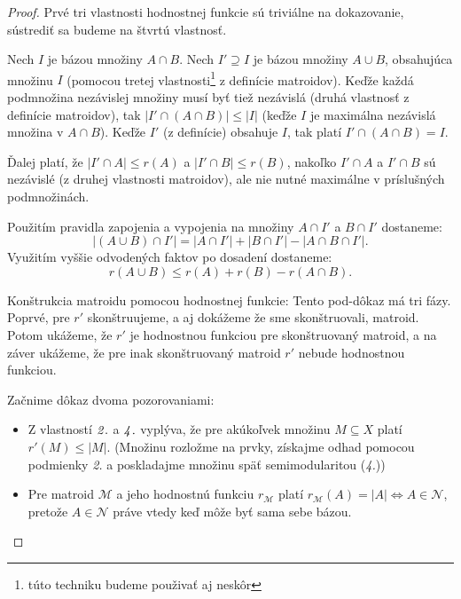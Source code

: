 \begin{proof}
Prvé tri vlastnosti hodnostnej funkcie sú triviálne na dokazovanie, sústrediť sa budeme na štvrtú vlastnosť.

Nech $I$ je bázou množiny $A\cap B$.
Nech $I' \supseteq I$ je bázou množiny $A \cup B$, obsahujúca množinu $I$ (pomocou tretej vlastnosti\footnote{túto techniku budeme použivať aj neskôr} z definície matroidov).
Keďže každá podmnožina nezávislej množiny musí byť tiež nezávislá (druhá vlastnosť z definície matroidov), tak $|I' \cap (A \cap B)| \leq |I|$ (keďže $I$ je maximálna nezávislá množina v $A\cap B$). Keďže $I'$ (z definície) obsahuje $I$, tak platí $I' \cap (A \cap B) = I$. 

Ďalej platí, že $|I' \cap A| \leq r(A)$ a $|I' \cap B| \leq r(B)$, nakoľko $I' \cap A$ a $I' \cap B$ sú nezávislé (z druhej vlastnosti matroidov), ale nie nutné maximálne v príslušných podmnožinách.

Použitím pravidla zapojenia a vypojenia na množiny $A \cap I'$ a $B \cap I'$ dostaneme:
$$|(A \cup B) \cap I'| = |A \cap I'| + |B \cap I'| - |A \cap B \cap I'|.$$
Využitím vyššie odvodených faktov po dosadení dostaneme:
$$r(A \cup B) \leq r(A) + r(B) - r(A \cap B).$$

Konštrukcia matroidu pomocou hodnostnej funkcie:
	Tento pod-dôkaz má tri fázy. Poprvé, pre $r'$ skonštruujeme, a aj dokážeme že sme skonštruovali, matroid. Potom ukážeme, že $r'$ je hodnostnou funkciou pre skonštruovaný matroid, a na záver ukážeme, že pre inak skonštruovaný matroid $r'$ nebude hodnostnou funkciou.

	\bigskip
	Začnime dôkaz dvoma pozorovaniami:
	\begin{itemize}
	\item	Z vlastností $\it 2.$ a $\it 4.$ vyplýva, že pre akúkoľvek množinu $M \subseteq X$ platí $r'(M) \le |M|$. (Množinu rozložme na prvky, získajme odhad pomocou podmienky {\it 2.} a poskladajme množinu späť semimodularitou ({\it 4.}))
	\item	Pre matroid $\mathcal{M}$ a jeho hodnostnú funkciu $r_\mathcal{M}$ platí $r_\mathcal{M}(A) = |A| \iff A \in \mathcal{N}$, pretože $A \in \mathcal{N}$ práve vtedy keď môže byť sama sebe bázou.
	\end{itemize}


\end{proof}
